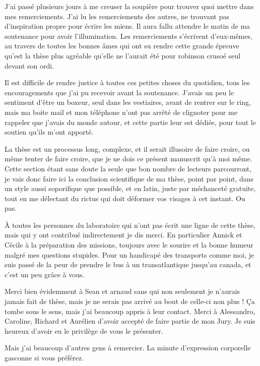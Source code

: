 J'ai passé plusieurs jours à me creuser la soupière pour trouver quoi mettre dans mes remerciements. J'ai lu les remerciements 
des autres, ne trouvant pas d'inspiration propre pour écrire les miens. Il aura fallu attendre le matin de ma soutenance pour 
avoir l'illumination. Les remerciements s'écrivent d'eux-mêmes, au travers de toutes les bonnes âmes qui ont su rendre cette 
grande épreuve qu'est la thèse plus agréable qu'elle ne l'aurait été pour robinson crusoé seul devant son ordi. 

Il est difficile de rendre justice à toutes ces petites choses du quotidien, tous les encouragements que j'ai pu recevoir avant 
la soutenance. J'avais un peu le sentiment d'être un boxeur, seul dans les vestiaires, avant de rentrer sur le ring, mais ma 
boite mail et mon téléphone n'ont pas arrêté de clignoter pour me rappeler que j'avais du monde autour, et cette partie leur 
est dédiée, pour tout le soutien qu'ils m'ont apporté. 

La thèse est un processus long, complexe, et il serait illusoire de faire croire, ou même tenter de faire croire, que je ne dois
ce présent manuscrit qu'à moi même. Cette section étant sans doute la seule que bon nombre de lecteurs parcourront, je vais donc
faire ici la conclusion scientifique de ma thèse, point par point, dans un style aussi soporifique que possible, et en latin,
juste par méchanceté gratuite, tout en me délectant du rictus qui doit déformer vos visages à cet instant. Ou pas.

À toutes les personnes du laboratoire qui n'ont pas écrit une ligne de cette thèse, mais qui y ont contribué indirectement je
dis merci. En particulier Annick et Cécile à la préparation des missions, toujours avec le sourire et la bonne humeur malgré mes
questions stupides. Pour un handicapé des transports comme moi, je suis passé de la peur de prendre le bus à un transatlantique
jusqu'au canada, et c'est un peu grâce à vous. 

Merci bien évidemment à Sean et arnaud sans qui non seulement je n'aurais jamais fait de thèse, mais je ne serais pas arrivé au
bout de celle-ci non plus ! Ça tombe sous le sens, mais j'ai beaucoup appris à leur contact. Merci à Alessandro, Caroline,
Richard et Aurélien d'avoir accepté de faire partie de mon Jury. Je suis heureux d'avoir eu le privilège de vous le présenter.

Mais j'ai beaucoup d'autres gens à remercier. La minute d'expression corporelle gasconne si vous préférez. 

\bigskip

